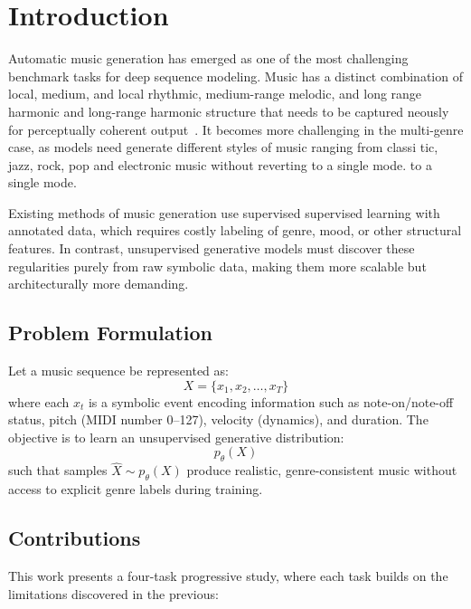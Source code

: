 \documentclass[conference]{IEEEtran}
\begin{document}
\section{Introduction}
 
Automatic music generation has emerged as one of the most challenging benchmark tasks for deep sequence modeling. Music has a distinct combination of local, medium, and
local rhythmic, medium-range melodic, and long range harmonic
and long-range harmonic structure that needs to be captured
neously for perceptually coherent output~\cite{huang2019}. It  becomes more challenging in the multi-genre case, as models need
generate different styles of music ranging from classi
tic, jazz, rock, pop and electronic music without reverting to a single mode. to a single mode.
 
Existing methods of music generation use supervised
supervised learning with annotated data, which requires costly labeling of genre, mood, or other structural features. In contrast, unsupervised generative models must discover these regularities purely from raw symbolic data, making them more scalable but architecturally more demanding.

\subsection{Problem Formulation}
 
Let a music sequence be represented as:
\begin{equation}
X = \{x_1, x_2, \ldots, x_T\}
\end{equation}
where each $x_t$ is a symbolic event encoding information such as note-on/note-off status, pitch (MIDI number 0--127), velocity (dynamics), and duration. The objective is to learn an unsupervised generative distribution:
\begin{equation}
p_\theta(X)
\end{equation}
such that samples $\hat{X} \sim p_\theta(X)$ produce realistic, genre-consistent music without access to explicit genre labels during training.
 
\subsection{Contributions}
 
This work presents a four-task progressive study, where each task builds on the limitations discovered in the previous:
 
\end{document}
